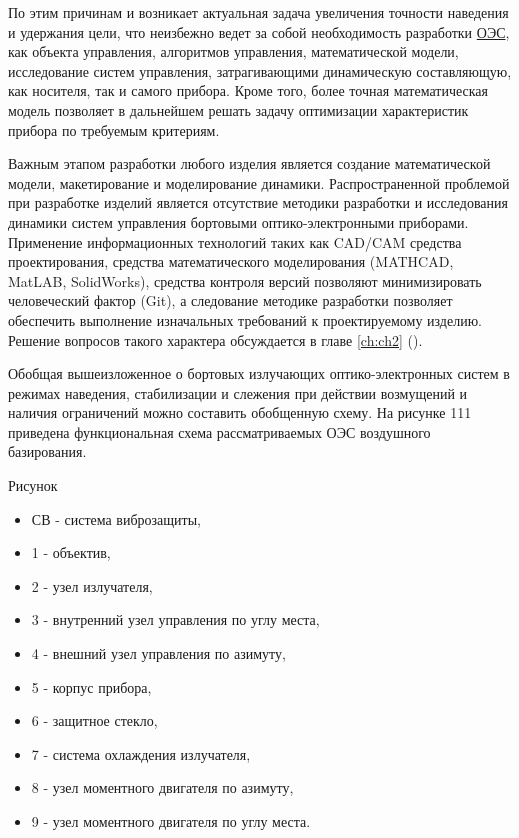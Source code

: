 По этим причинам и возникает актуальная задача увеличения точности наведения и удержания цели, что неизбежно ведет за собой необходимость разработки \hyperref[acroEOS]{ОЭС}, как объекта управления, алгоритмов управления, математической модели, исследование систем управления, затрагивающими динамическую составляющую, как носителя, так и самого прибора. Кроме того, более точная математическая модель позволяет в дальнейшем решать задачу оптимизации характеристик прибора по требуемым критериям.
 
Важным этапом разработки любого изделия является создание математической модели, макетирование и моделирование динамики. Распространенной проблемой при разработке изделий является отсутствие методики разработки и исследования динамики систем управления бортовыми оптико-электронными приборами. Применение информационных технологий таких как CAD/CAM средства проектирования, средства математического моделирования (MATHCAD, MatLAB, SolidWorks), средства контроля версий позволяют минимизировать человеческий фактор (Git), а следование методике разработки позволяет обеспечить выполнение изначальных требований к проектируемому изделию. Решение вопросов такого характера обсуждается в главе \ref{ch:ch2} ().

Обобщая вышеизложенное о бортовых излучающих оптико-электронных систем в режимах наведения, стабилизации и слежения при действии возмущений и наличия  ограничений можно составить обобщенную схему. На рисунке 111 приведена функциональная схема  рассматриваемых ОЭС воздушного базирования.

Рисунок

\begin{itemize}
	\item СВ - система виброзащиты,
	\item 1 - объектив,
	\item 2 - узел излучателя,
	\item 3 - внутренний узел управления по углу места,
	\item 4 - внешний узел управления по азимуту,
	\item 5 - корпус прибора,
	\item 6 - защитное стекло,
	\item 7 - система охлаждения излучателя,
	\item 8 - узел моментного двигателя по азимуту,
	\item 9 - узел моментного двигателя по углу места.
\end{itemize}


